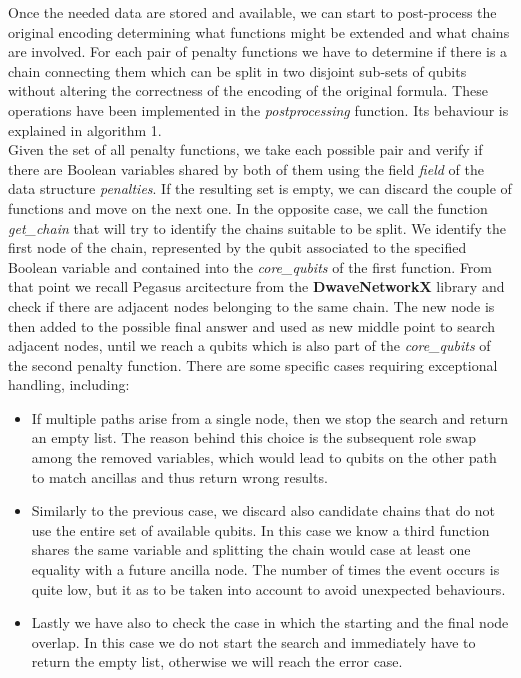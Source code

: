 Once the needed data are stored and available, we can start to post-process the original encoding determining what functions might be extended and what chains are involved. For each pair of penalty functions we have to determine if there is a chain connecting them which can be split in two disjoint sub-sets of qubits without altering the correctness of the encoding of the original formula. 
These operations have been implemented in the \textit{postprocessing} function. Its behaviour is explained in algorithm 1.\\
Given the set of all penalty functions, we take each possible pair and verify if there are Boolean variables shared by both of them using the field \textit{field} of the data structure \textit{penalties}. If the resulting set is empty, we can discard the couple of functions and move on the next one. In the opposite case, we call the function \textit{get\_chain} that will try to identify the chains suitable to be split. We identify the first node of the chain, represented by the qubit associated to the specified Boolean variable and contained into the \textit{core\_qubits} of the first function. From that point we recall Pegasus arcitecture from the \textbf{DwaveNetworkX} library and check if there are adjacent nodes belonging to the same chain. The new node is then added to the possible final answer and used as new middle point to search adjacent nodes, until we reach a qubits which is also part of the \textit{core\_qubits} of the second penalty function. There are some specific cases requiring exceptional handling, including:

\begin{itemize}
    \item If multiple paths arise from a single node, then we stop the search and return an empty list. The reason behind this choice is the subsequent role swap among the removed variables, which would lead to qubits on the other path to match ancillas and thus return wrong results.
    \item Similarly to the previous case, we discard also candidate chains that do not use the entire set of available qubits. In this case we know a third function shares the same variable and splitting the chain would case at least one equality with a future ancilla node. The number of times the event occurs is quite low, but it as to be taken into account to avoid unexpected behaviours.
    \item Lastly we have also to check the case in which the starting and the final node overlap. In this case we do not start the search and immediately have to return the empty list, otherwise we will reach the error case.
\end{itemize}

